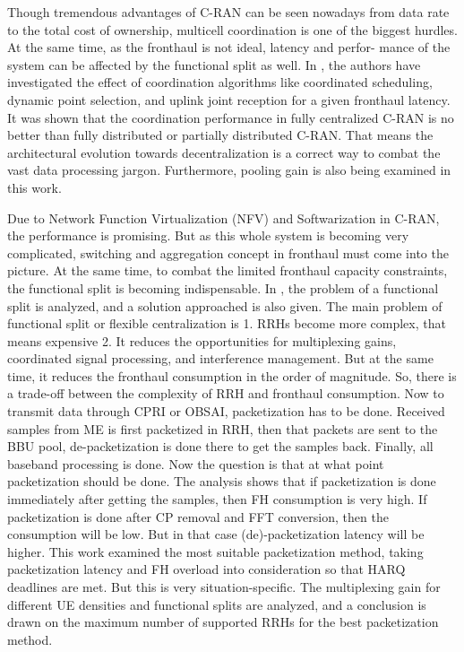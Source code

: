 \begin{multicols}{2}
Though tremendous advantages of C-RAN can be seen nowadays from data rate to the total cost of ownership, multicell coordination is one of the biggest hurdles. At the same time, as the fronthaul is not ideal, latency and perfor- mance of the system can be affected by the functional split as well. In \cite{art3-key28}, the authors have investigated the effect of coordination algorithms like coordinated scheduling, dynamic point selection, and uplink joint reception for a given fronthaul latency. It was shown that the coordination performance in fully centralized C-RAN is no better than fully distributed or partially distributed C-RAN. That means the architectural evolution towards decentralization is a correct way to combat the vast data processing jargon. Furthermore, pooling gain is also being examined in this work.

Due to Network Function Virtualization (NFV) and Softwarization in C-RAN, the performance is promising. But as this whole system is becoming very complicated, switching and aggregation concept in fronthaul must come into the picture. At the same time, to combat the limited fronthaul capacity constraints, the functional split is becoming indispensable. In \cite{art3-key29}, the problem of a functional split is analyzed, and a solution approached is also given. The main problem of functional split or flexible centralization is 1. RRHs become more complex, that means expensive 2. It reduces the opportunities for multiplexing gains, coordinated signal processing, and interference management. But at the same time, it reduces the fronthaul consumption in the order of magnitude. So, there is a trade-off between the complexity of RRH and fronthaul consumption. Now to transmit data through CPRI or OBSAI, packetization has to be done. Received samples from ME is first packetized in RRH, then that packets are sent to the BBU pool, de-packetization is done there to get the samples back. Finally, all baseband processing is done. Now the question is that at what point packetization should be done. The analysis shows that if packetization is done immediately after getting the samples, then FH consumption is very high. If packetization is done after CP removal and FFT conversion, then the consumption will be low. But in that case (de)-packetization latency will be higher. This work examined the most suitable packetization method, taking packetization latency and FH overload into consideration so that HARQ deadlines are met. But this is very situation-specific. The multiplexing gain for different UE densities and functional splits are analyzed, and a conclusion is drawn on the maximum number of supported RRHs for the best packetization method.


\end{multicols}
